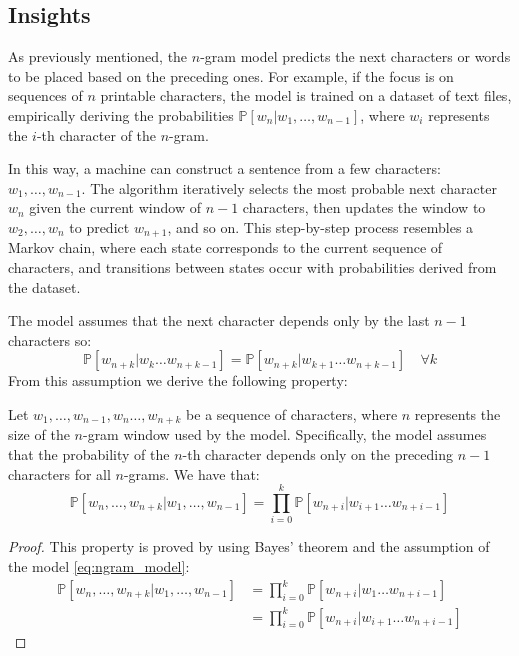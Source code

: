 \subsection{Insights}
As previously mentioned, the $n$-gram model predicts the next characters or words to be placed based on the preceding ones. For example, if the focus is on sequences of $n$ printable characters, the model is trained on a dataset of text files, empirically deriving the probabilities $\mathbb{P}\left[w_n|w_1,\dots,w_{n-1}\right]$, where $w_i$ represents the $i$-th character of the $n$-gram.

\noindent In this way, a machine can construct a sentence from a few characters: $w_1,\ldots,w_{n-1}$. The algorithm iteratively selects the most probable next character $w_{n}$ given the current window of $n-1$ characters, then updates the window to $w_2,\ldots,w_{n}$ to predict $w_{n+1}$, and so on. This step-by-step process resembles a Markov chain, where each state corresponds to the current sequence of characters, and transitions between states occur with probabilities derived from the dataset.

\noindent The model assumes that the next character  depends only by the last $n-1$ characters so:
\begin{equation}
	\mathbb{P}\left[w_{n+k}|w_k\dots w_{n+k-1}\right] = \mathbb{P}\left[w_{n+k}|w_{k+1}\dots w_{n+k-1}\right] \quad \forall k
	\label{eq:ngram_model}
\end{equation}
From this assumption we derive the following property:
\begin{proposition}
		Let $w_1,\dots,w_{n-1},w_n\dots,w_{n+k}$ be a sequence of characters, where $n$ represents the size of the $n$-gram window used by the model. Specifically, the model assumes that the probability of the $n$-th character depends only on the preceding $n-1$ characters for all $n$-grams. We have that:
\begin{equation}
	\mathbb{P}\left[w_n,\dots,w_{n+k}|w_1,\dots,w_{n-1}\right] = \prod_{i=0}^{k}\mathbb{P}\left[w_{n+i}|w_{i+1}\dots w_{n+i-1}\right]
	\label{eq:ngram_model_prop}
\end{equation}
\end{proposition}

\begin{proof}
	This property is proved by using Bayes' theorem and the assumption of the model \cref{eq:ngram_model}:
\begin{align*}
	\mathbb{P}\left[w_n,\dots,w_{n+k}|w_1,\dots,w_{n-1}\right] &= \prod_{i=0}^{k}\mathbb{P}\left[w_{n+i}|w_1\dots w_{n+i-1}\right] \\
	&= \prod_{i=0}^{k}\mathbb{P}\left[w_{n+i}|w_{i+1}\dots w_{n+i-1}\right]
\end{align*}
\end{proof}

